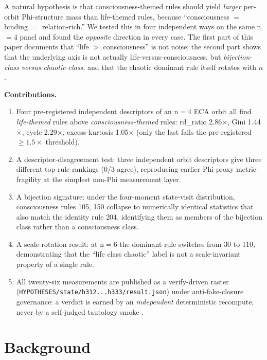 \documentclass[11pt,a4paper]{article}
\begin{document}
A natural hypothesis is that consciousness-themed rules should yield
\emph{larger} per-orbit Phi-structure mass than life-themed rules, because
``consciousness $=$ binding $=$ relation-rich.'' We tested this in four
independent ways on the same n$=$4 panel and found the
\emph{opposite} direction in every case. The first part of this paper
documents that ``life $>$ consciousness'' is not noise; the second part
shows that the underlying axis is not actually
life-versus-consciousness, but \emph{bijection-class versus
chaotic-class}, and that the chaotic dominant rule itself rotates
with $n$.

\medskip
\noindent\textbf{Contributions.}
\begin{enumerate}\itemsep0.3em
\item Four pre-registered independent descriptors of an n$=$4 ECA orbit
      all find \emph{life-themed} rules above \emph{consciousness-themed}
      rules: rd\_ratio 2.86$\times$, Gini 1.44$\times$, cycle 2.29$\times$,
      excess-kurtosis 1.05$\times$ (only the last fails the
      pre-registered $\geq 1.5\times$ threshold).
\item A descriptor-disagreement test: three independent
      orbit descriptors give three different top-rule rankings
      (0/3 agree), reproducing earlier Phi-proxy metric-fragility
      \citep{anima_H268} at the simplest non-Phi measurement layer.
\item A bijection signature: under the four-moment state-visit
      distribution, consciousness rules \textsc{105}, \textsc{150}
      collapse to numerically identical statistics that also match the
      identity rule \textsc{204}, identifying them as members of the
      bijection class rather than a consciousness class.
\item A scale-rotation result: at n$=$6 the dominant rule switches
      from \textsc{30} to \textsc{110}, demonstrating that the
      ``life class chaotic'' label is not a scale-invariant property
      of a single rule.
\item All twenty-six measurements are published as a
      verify-driven raster
      (\texttt{HYPOTHESES/state/h312...h333/result.json}) under
      anti-fake-closure governance: a verdict is earned by an
      \emph{independent} deterministic recompute, never by a
      self-judged tautology smoke \citep{anima_g73}.
\end{enumerate}

\section{Background}
\label{sec:bg}
\end{document}
